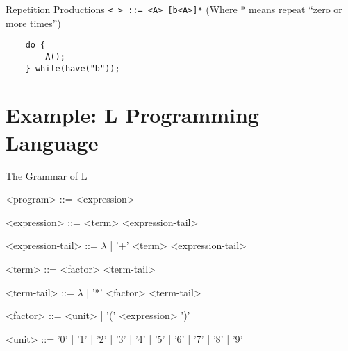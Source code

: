 \documentclass[]{beamer}
\begin{document}
\begin{frame}[fragile]{Repetition Productions}
    \texttt{< > ::= <A> [b<A>]*} (Where * means repeat ``zero or more times'')

    \pause

    \begin{verbatim}
    do {
        A();
    } while(have("b"));
    \end{verbatim}
\end{frame}

\section{Example: L Programming Language}
\begin{frame}{The Grammar of L}
\begin{grammar}
    <program> ::= <expression>

    <expression> ::= <term> <expression-tail>
    
    <expression-tail> ::= $\lambda$ | '+' <term> <expression-tail>
    
    <term> ::= <factor> <term-tail>
    
    <term-tail> ::= $\lambda$ | '*' <factor> <term-tail>
    
    <factor> ::= <unit> | '(' <expression> ')'
    
    <unit> ::= '0' | '1' | '2' | '3' | '4' | '5' | '6' | '7' | '8'
    | '9'
\end{grammar}

\end{frame}
\end{document}
